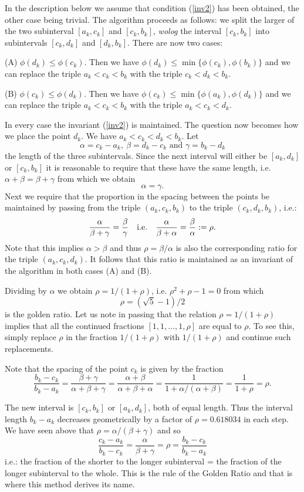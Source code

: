 In the description below we assume that condition (\ref{inv2}) has been obtained, the other case being trivial.
The algorithm proceeds as follows: we split the larger of the two subinterval $[a_k,c_k]$ and $[c_k,b_k]$, 
\textit{wolog} the interval $[c_k,b_k]$ into subintervals $[c_k,d_k]$ and $[d_k,b_k]$. There are now two cases:

\medskip\noindent
(A) $\phi(d_k)\leq\phi(c_k)$. Then we have $\phi(d_k)\leq\min\{\phi(c_k),\phi(b_k)\}$ and we can replace the triple
$a_k<c_k<b_k$ with the triple $c_k<d_k<b_k$.

\medskip\noindent
(B) $\phi(c_k)\leq\phi(d_k)$. Then we have $\phi(c_k)\leq\min\{\phi(a_k),\phi(d_k)\}$ and we can replace the triple
$a_k<c_k<b_k$ with the triple $a_k<c_k<d_k$.

In every case the invariant (\ref{inv2}) is maintained. The question now becomes how we place the point $d_k$.
We have $a_k<c_k<d_k<b_k$. Let
$$
\alpha=c_k-a_k,\ \beta=d_k-c_k\text{ and }\gamma=b_k-d_k
$$
the length of the three subintervals. Since the next interval will either be $[a_k,d_k]$ or $[c_k,b_k]$ it is 
reasonable to require that these have the same length, i.e. $\alpha+\beta=\beta+\gamma$ from which we obtain
$$
\alpha=\gamma.
$$
Next we require that the proportion in the spacing between the points be maintained by passing from 
the triple $(a_k,c_k,b_k)$ to the triple $(c_k,d_k,b_k)$, i.e.: 
$$
\frac{\alpha}{\beta+\gamma}=\frac{\beta}{\gamma}
\quad\text{i.e.}\quad
\frac{\alpha}{\beta+\alpha}=\frac{\beta}{\alpha}:=\rho.
$$
Note that this implies $\alpha>\beta$ and thus $\rho=\beta/\alpha$ is also the corresponding ratio for the triple 
$(a_k,c_k,d_k)$. It follows that this ratio is maintained as an invariant of the algorithm in both cases (A) and (B). 

\noindent
Dividing by $\alpha$ we obtain $\rho=1/(1+\rho)$, i.e. $\rho^2+\rho-1=0$ from which 
$$
\rho=(\sqrt{5}-1)/2
$$
is the golden ratio. Let us note in passing that the relation $\rho=1/(1+\rho)$ implies that all the continued 
fractions $[1,1,\dots,1,\rho]$ are equal to $\rho$. To see this, simply replace $\rho$ in the fraction $1/(1+\rho)$
with $1/(1+\rho)$ and continue such replacements.

\noindent
Note that the spacing of the point $c_k$ is given by the fraction
$$
\frac{b_k-c_k}{b_k-a_k}=
\frac{\beta+\gamma}{\alpha+\beta+\gamma}=
\frac{\alpha+\beta}{\alpha+\beta+\alpha}=
\frac{1}{1+\alpha/(\alpha+\beta)}=
\frac{1}{1+\rho}=\rho.
$$

The new interval is $[c_k,b_k]$ or $[a_k,d_k]$, both of equal length.
Thus the interval length $b_k-a_k$ decreases geometrically by a factor of $\rho=0.618034$ in each step. 
We have seen above that $\rho=\alpha/(\beta+\gamma)$ and so
$$
\frac{c_k-a_k}{b_k-c_k}=\frac{\alpha}{\beta+\gamma}=\rho=\frac{b_k-c_k}{b_k-a_k}
$$
i.e.: the fraction of the shorter to the longer subinterval = the fraction of the longer subinterval to the whole.
This is the rule of the Golden Ratio and that is where this method derives its name.

